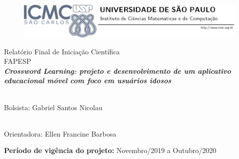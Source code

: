 \begin{titlepage}

\begin{center}
	\begin{figure}[!ht]
	\centering
	\includegraphics[scale=0.5]{Figuras/logo.png}
	\end{figure}
	\vspace{60pt}
	\begin{minipage}[c]{13.5cm}
			\begin{center}
			\vspace{1.3cm} {\Large\sf Relatório Final de Iniciação Científica}\\
			\vspace{0.3cm} {\Large\sf FAPESP}\\
			\vspace{5cm}
			\textbf{\Large\sf\textit{Crossword Learning: projeto e desenvolvimento de um
aplicativo educacional móvel com foco em usuários
idosos}}\\
			\vspace{1.3cm}
			\end{center}
		\end{minipage}
\vfill


\sffamily
\begin{minipage}[t]{0.4\linewidth}
\begin{center}
\hrulefill\\
\vspace{6pt}
Bolsista: Gabriel Santos Nicolau
\end{center}
\end{minipage} \hfill
\begin{minipage}[t]{0.4\linewidth}
\begin{center}
\hrulefill\\
\vspace{6pt}
Orientadora: Ellen Francine Barbosa
\end{center}
\end{minipage}

\vspace{70pt} %

\begin{minipage}[c]{13.5cm}
	\begin{center}
		\sffamily\textbf{Período de vigência do projeto:} Novembro/2019 a Outubro/2020\\
	\end{center}
\end{minipage}

\end{center}
\cleardoublepage
\end{titlepage}